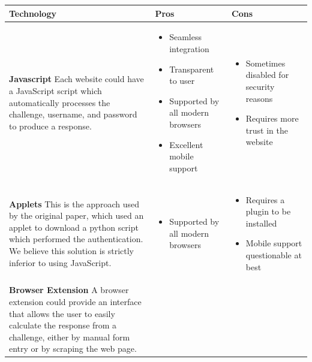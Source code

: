 \documentclass[11pt]{article}
\begin{document}
\small
\begin{center}
    \begin{tabular}{|  p{6cm} | p{5cm} | p{5cm} |}
    \hline
    Technology & Pros & Cons \\ \hline
    \vspace{.4cm}
    \textbf{Javascript}
    Each website could have a JavaScript script which automatically processes the challenge, username, and password to produce a response. & 

    \begin{itemize}[leftmargin=*]
    \item Seamless integration

    \item Transparent to user

    \item Supported by all modern browsers

    \item Excellent mobile support
    \end{itemize}
    &
    \begin{itemize}[leftmargin=*]
    \item Sometimes disabled for security reasons

    \item Requires more trust in the website
    \end{itemize}
    \\ \hline
    \vspace{.4cm}
    \textbf{Applets}
    This is the approach used by the original paper, which used an applet to download a python script which performed the authentication. We believe this solution is strictly inferior to using JavaScript.
    &
    \begin{itemize}[leftmargin=*]
    \item  Supported by all modern browsers
    \end{itemize}
    &
    \begin{itemize}[leftmargin=*]
    \item Requires a plugin to be installed

    \item Mobile support questionable at best
    \end{itemize}

    \\ \hline
    \vspace{.4cm}
    \textbf{Browser Extension}
    A browser extension could provide an interface that allows the user to easily calculate the response from a challenge, either by manual form entry or by scraping the web page.


\end{tabular}
\end{center}
\end{document}
